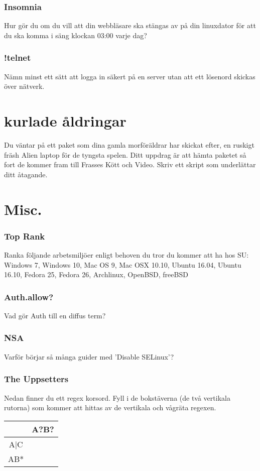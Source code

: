 \documentclass[a4paper]{report}
\begin{document}
\subsubsection{Insomnia}
Hur gör du om du vill att din webbläsare ska stängas av på din linuxdator för att du ska komma i säng klockan 03:00 varje dag?

\subsubsection{!telnet}
Nämn minst ett sätt att logga in säkert på en server utan att ett lösenord skickas över nätverk.

\section{kurlade åldringar}
Du väntar på ett paket som dina gamla morföräldrar har skickat efter, en ruskigt fräsh Alien laptop för de tyngsta spelen. Ditt uppdrag är att hämta paketet så fort de kommer fram till Frasses Kött och Video. Skriv ett skript som underlättar ditt åtagande.

\section{Misc.}
\subsubsection{Top Rank}
Ranka följande arbetsmiljöer enligt behoven du tror du kommer att ha hos SU:
Windows 7, Windows 10, Mac OS 9, Mac OSX 10.10, Ubuntu 16.04, Ubuntu 16.10, Fedora 25, Fedora 26, Archlinux, OpenBSD, freeBSD

\subsubsection{Auth.allow?}
Vad gör Auth till en diffus term?

\subsubsection{NSA}
Varför börjar så många guider med 'Disable SELinux'?

\subsubsection{The Uppsetters}
Nedan finner du ett regex korsord. Fyll i de bokstäverna (de två vertikala rutorna) som kommer att hittas av de vertikala och vågräta regexen.
\newline
\begin{tabular}{| c | c |}
\hline
& A?B? \\ \hline
A|C & \\ \hline
AB* & \\ \hline
\end{tabular}
\end{document}
